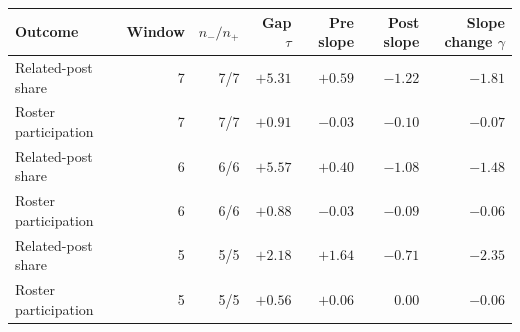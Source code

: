 \caption{Segmented fits for attention and participation. Window is calendar days per side, including October 6 in the post period; $n_-/n_+$ gives observed dates. Cutoff gaps are percentage points and slopes are percentage points per day. Related-post share uses all observed posts; participation uses the fixed roster of 1,002 accounts.}
\label{tab:rq4fits}
\centering
\begin{tabular}{lrrrrrr}
\toprule Outcome & Window & $n_-/n_+$ & Gap $\tau$ & Pre slope & Post slope & Slope change $\gamma$\\
\midrule
Related-post share & 7 & 7/7 & $+5.31$ & $+0.59$ & $-1.22$ & $-1.81$\\
Roster participation & 7 & 7/7 & $+0.91$ & $-0.03$ & $-0.10$ & $-0.07$\\
Related-post share & 6 & 6/6 & $+5.57$ & $+0.40$ & $-1.08$ & $-1.48$\\
Roster participation & 6 & 6/6 & $+0.88$ & $-0.03$ & $-0.09$ & $-0.06$\\
Related-post share & 5 & 5/5 & $+2.18$ & $+1.64$ & $-0.71$ & $-2.35$\\
Roster participation & 5 & 5/5 & $+0.56$ & $+0.06$ & $0.00$ & $-0.06$\\
\bottomrule
\end{tabular}
